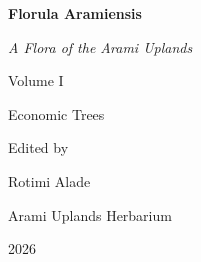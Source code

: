 \begin{titlepage}
	\centering
	\vspace*{30mm}
	{\Huge\bfseries Florula Aramiensis\par}
	\vspace{6mm}
	{\Large\itshape A Flora of the Arami Uplands\par}
	\vspace{14mm}
	{\large Volume I\par}
	\vspace{2mm}
	{\Large Economic Trees\par}
	\vfill
	{\large Edited by\par}
	\vspace{2mm}
	{\Large Rotimi Alade\par}
	\vspace{16mm}
	{\normalsize Arami Uplands Herbarium\par}
	\vspace{2mm}
	{\normalsize 2026\par}
\end{titlepage}